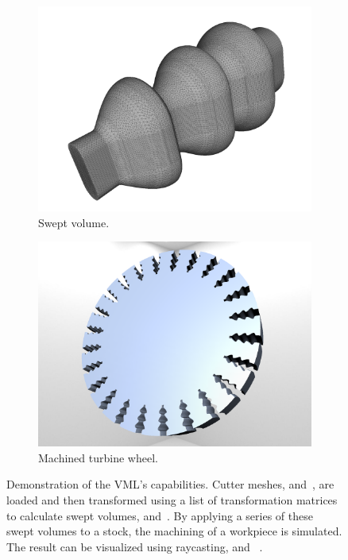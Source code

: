 \begin{figure}[h]
\begin{subfigure}[t]{0.32\textwidth}
			\includegraphics[width=\textwidth]{images/turbine_swept}
			\caption{Swept volume.}
			\label{fig:turbine_swept}
		\end{subfigure}
		\begin{subfigure}[t]{0.32\textwidth}
			\centering
			\includegraphics[width=\textwidth]{images/turbine_complete}
			\caption{Machined turbine wheel.}
			\label{fig:turbine_complete}
		\end{subfigure}
	\caption{
		Demonstration of the VML's capabilities.
		Cutter meshes, \cf {} and~, are loaded and then transformed using a list of transformation matrices to calculate swept volumes, \cf {} and~.
		By applying a series of these swept volumes to a stock, the machining of a workpiece is simulated.
		The result can be visualized using raycasting, \cf {} and~ \cite{engrave_report}.
	}
	\label{fig:vml_demo}
\end{figure}


